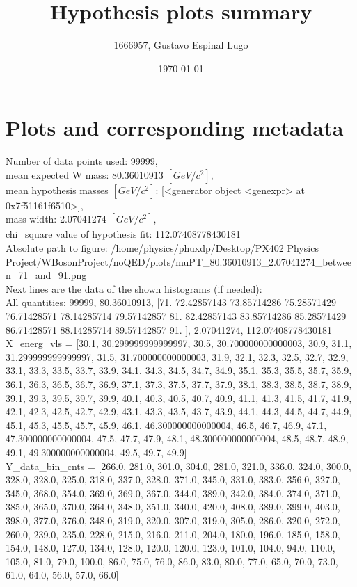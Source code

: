 \documentclass[12pt]{article}
\begin{document}
	\title{Hypothesis plots summary} %
	\author{1666957, Gustavo Espinal Lugo}
	\date{\today} %

	\maketitle
	
	\section*{Plots and corresponding metadata}
	Number of data points used: 99999,\\
mean expected W mass: 80.36010913 $[GeV/c^{2}]$,\\
mean hypothesis masses $[GeV/c^{2}]$: [<generator object <genexpr> at 0x7f51161f6510>],\\
mass width: 2.07041274 $[GeV/c^{2}]$,\\
chi\_square value of hypothesis fit: 112.07408778430181\\
	Absolute path to figure: /home/physics/phuxdp/Desktop/PX402 Physics Project/WBosonProject/noQED/plots/muPT\_80.36010913\_2.07041274\_between\_71\_and\_91.png\\
	Next lines are the data of the shown histograms (if needed): \\
	All quantities: 	99999, 80.36010913, [71.         72.42857143 73.85714286 75.28571429 76.71428571 78.14285714
 79.57142857 81.         82.42857143 83.85714286 85.28571429 86.71428571
 88.14285714 89.57142857 91.        ], 2.07041274, 112.07408778430181\\
	X\_energ\_vls = [30.1, 30.299999999999997, 30.5, 30.700000000000003, 30.9, 31.1, 31.299999999999997, 31.5, 31.700000000000003, 31.9, 32.1, 32.3, 32.5, 32.7, 32.9, 33.1, 33.3, 33.5, 33.7, 33.9, 34.1, 34.3, 34.5, 34.7, 34.9, 35.1, 35.3, 35.5, 35.7, 35.9, 36.1, 36.3, 36.5, 36.7, 36.9, 37.1, 37.3, 37.5, 37.7, 37.9, 38.1, 38.3, 38.5, 38.7, 38.9, 39.1, 39.3, 39.5, 39.7, 39.9, 40.1, 40.3, 40.5, 40.7, 40.9, 41.1, 41.3, 41.5, 41.7, 41.9, 42.1, 42.3, 42.5, 42.7, 42.9, 43.1, 43.3, 43.5, 43.7, 43.9, 44.1, 44.3, 44.5, 44.7, 44.9, 45.1, 45.3, 45.5, 45.7, 45.9, 46.1, 46.300000000000004, 46.5, 46.7, 46.9, 47.1, 47.300000000000004, 47.5, 47.7, 47.9, 48.1, 48.300000000000004, 48.5, 48.7, 48.9, 49.1, 49.300000000000004, 49.5, 49.7, 49.9]\\
	Y\_data\_bin\_cnts = [266.0, 281.0, 301.0, 304.0, 281.0, 321.0, 336.0, 324.0, 300.0, 328.0, 328.0, 325.0, 318.0, 337.0, 328.0, 371.0, 345.0, 331.0, 383.0, 356.0, 327.0, 345.0, 368.0, 354.0, 369.0, 369.0, 367.0, 344.0, 389.0, 342.0, 384.0, 374.0, 371.0, 385.0, 365.0, 370.0, 364.0, 348.0, 351.0, 340.0, 420.0, 408.0, 389.0, 399.0, 403.0, 398.0, 377.0, 376.0, 348.0, 319.0, 320.0, 307.0, 319.0, 305.0, 286.0, 320.0, 272.0, 260.0, 239.0, 235.0, 228.0, 215.0, 216.0, 211.0, 204.0, 180.0, 196.0, 185.0, 158.0, 154.0, 148.0, 127.0, 134.0, 128.0, 120.0, 120.0, 123.0, 101.0, 104.0, 94.0, 110.0, 105.0, 81.0, 79.0, 100.0, 86.0, 75.0, 76.0, 86.0, 83.0, 80.0, 77.0, 65.0, 70.0, 73.0, 61.0, 64.0, 56.0, 57.0, 66.0]\\
\end{document}
